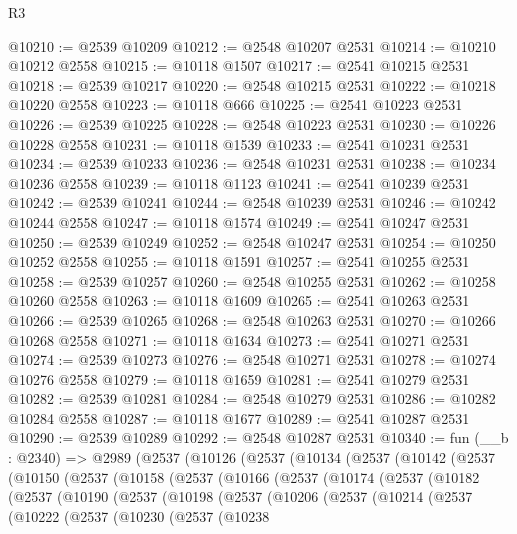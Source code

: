 \begin{lexlean}{R3}
\begin{coremodule}
@10210 := @2539 @10209
@10212 := @2548 @10207 @2531
@10214 := @10210 @10212 @2558
@10215 := @10118 @1507
@10217 := @2541 @10215 @2531
@10218 := @2539 @10217
@10220 := @2548 @10215 @2531
@10222 := @10218 @10220 @2558
@10223 := @10118 @666
@10225 := @2541 @10223 @2531
@10226 := @2539 @10225
@10228 := @2548 @10223 @2531
@10230 := @10226 @10228 @2558
@10231 := @10118 @1539
@10233 := @2541 @10231 @2531
@10234 := @2539 @10233
@10236 := @2548 @10231 @2531
@10238 := @10234 @10236 @2558
@10239 := @10118 @1123
@10241 := @2541 @10239 @2531
@10242 := @2539 @10241
@10244 := @2548 @10239 @2531
@10246 := @10242 @10244 @2558
@10247 := @10118 @1574
@10249 := @2541 @10247 @2531
@10250 := @2539 @10249
@10252 := @2548 @10247 @2531
@10254 := @10250 @10252 @2558
@10255 := @10118 @1591
@10257 := @2541 @10255 @2531
@10258 := @2539 @10257
@10260 := @2548 @10255 @2531
@10262 := @10258 @10260 @2558
@10263 := @10118 @1609
@10265 := @2541 @10263 @2531
@10266 := @2539 @10265
@10268 := @2548 @10263 @2531
@10270 := @10266 @10268 @2558
@10271 := @10118 @1634
@10273 := @2541 @10271 @2531
@10274 := @2539 @10273
@10276 := @2548 @10271 @2531
@10278 := @10274 @10276 @2558
@10279 := @10118 @1659
@10281 := @2541 @10279 @2531
@10282 := @2539 @10281
@10284 := @2548 @10279 @2531
@10286 := @10282 @10284 @2558
@10287 := @10118 @1677
@10289 := @2541 @10287 @2531
@10290 := @2539 @10289
@10292 := @2548 @10287 @2531
@10340 := fun (__b : @2340) =>
  @2989
    (@2537
      (@10126
        (@2537
          (@10134
            (@2537
              (@10142
                (@2537
                  (@10150
                    (@2537
                      (@10158
                        (@2537
                          (@10166
                            (@2537
                              (@10174
                                (@2537
                                  (@10182
                                    (@2537
                                      (@10190
                                        (@2537
                                          (@10198
                                            (@2537
                                              (@10206
                                                (@2537
                                                  (@10214
                                                    (@2537
                                                      (@10222
                                                        (@2537
                                                          (@10230
                                                            (@2537
                                                              (@10238

\end{coremodule}
\end{lexlean}
